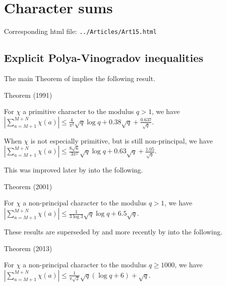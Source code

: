 \chapter{  Character sums}

Corresponding html file: \texttt{../Articles/Art15.html}










\section{Explicit Polya-Vinogradov inequalities}



The main Theorem of \cite{Qiu*91}
implies the following result.

\par 
\begin{thm}{Theorem (1991)}

  For $\chi$ a primitive character to the modulus $q > 1$, we have
$
\left|\sum\limits_{a=M+1}^{M+N}\chi(a)\right|
\le
\frac{4}{\pi^2}\sqrt{q}\log q+0.38\sqrt{q}+\frac{0.637}{\sqrt{q}}
$.
\par 
 When $\chi$ is not especially primitive, but is still non-principal, we
  have
$
\left|\sum\limits_{a=M+1}^{M+N}\chi(a)\right|
\le
\frac{8\sqrt{6}}{3\pi^2}\sqrt{q}\log q+0.63\sqrt{q}+\frac{1.05}{\sqrt{q}}
$.
\end{thm}

This was improved later by
\cite{Bachman-Rachakonda*01} into
the following.
\par 
\begin{thm}{Theorem (2001)}

  For $\chi$ a non-principal character to the modulus $q > 1$, we have
$
\left|\sum\limits_{a=M+1}^{M+N}\chi(a)\right|
\le
\frac{1}{3\log 3}\sqrt{q}\log q+6.5\sqrt{q}
$. 
\end{thm}


These results are superseded by
\cite{Frolenkov*11} and more
recently by
\cite{Frolenkov-Soundararajan*13} into
the following.
\par 
\begin{thm}{Theorem (2013)}

  For $\chi$ a non-principal character to the modulus $q\ge 1000$, we have
$
\left|\sum\limits_{a=M+1}^{M+N}\chi(a)\right|
\le
\frac{1}{\pi\sqrt{2}}\sqrt{q}(\log q+6)+\sqrt{q}
$. 
\end{thm}


